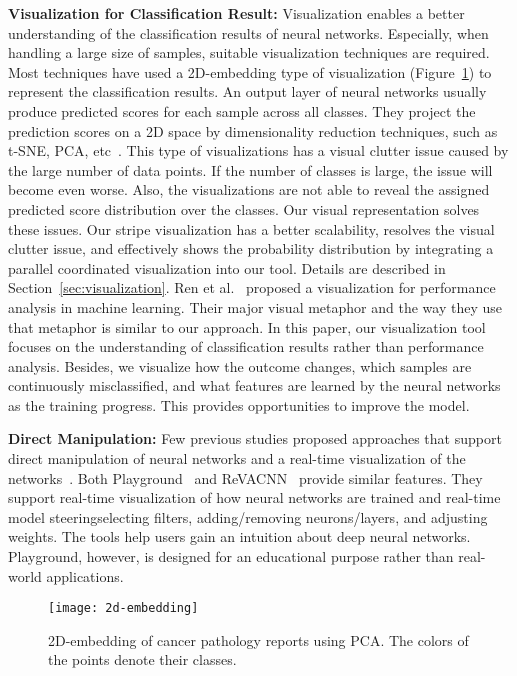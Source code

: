 \textbf{Visualization for Classification Result:}
Visualization enables a better understanding of the classification results of neural networks.
Especially, when handling a large size of samples, suitable visualization techniques are required.
Most techniques have used a 2D-embedding type of visualization (Figure~\ref{fig:t-sne}) to represent the classification results.
An output layer of neural networks usually produce predicted scores for each sample across all classes.
They project the prediction scores on a 2D space by dimensionality reduction techniques, such as t-SNE, PCA, etc~\cite{maaten2008visualizing,rauber2017visualizing,kahng2018activis,paiva2015approach}.
This type of visualizations has a visual clutter issue caused by the large number of data points.
If the number of classes is large, the issue will become even worse.
Also, the visualizations are not able to reveal the assigned predicted score distribution over the classes.
Our visual representation solves these issues.
Our stripe visualization has a better scalability, resolves the visual clutter issue, and effectively shows the probability distribution by integrating a parallel coordinated visualization into our tool.
Details are described in Section~\ref{sec:visualization}.
Ren et al.~\cite{ren2017squares} proposed a visualization for performance analysis in machine learning.
Their major visual metaphor and the way they use that metaphor is similar to our approach.
In this paper, our visualization tool focuses on the understanding of classification results rather than performance analysis.
Besides, we visualize how the outcome changes, which samples are continuously misclassified, and what features are learned by the neural networks as the training progress.
This provides opportunities to improve the model.

\textbf{Direct Manipulation:} Few previous studies proposed approaches that support direct manipulation of neural networks and a real-time visualization of the networks~\cite{smilkov2016direct,chung2016revacnn}.
Both Playground~\cite{smilkov2016direct} and ReVACNN~\cite{chung2016revacnn} provide similar features.
They support real-time visualization of how neural networks are trained and real-time model steering\textemdash selecting filters, adding/removing neurons/layers, and adjusting weights.
The tools help users gain an intuition about deep neural networks.
Playground, however, is designed for an educational purpose rather than real-world applications.

\begin{figure}[tb]
\centering
\texttt{[image: 2d-embedding]}
\caption{
2D-embedding of cancer pathology reports using PCA.
The colors of the points denote their classes.
}
\label{fig:t-sne}
\end{figure}


